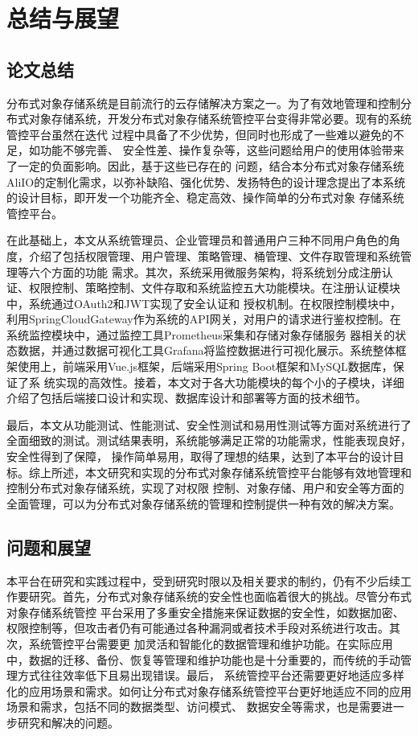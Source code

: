 \chapter{总结与展望}

\section{论文总结}


分布式对象存储系统是目前流行的云存储解决方案之一。为了有效地管理和控制分布式对象存储系统，开发分布式对象存储系统管控平台变得非常必要。现有的系统管控平台虽然在迭代
过程中具备了不少优势，但同时也形成了一些难以避免的不足，如功能不够完善、 安全性差、操作复杂等，这些问题给用户的使用体验带来了一定的负面影响。因此，基于这些已存在的
问题，结合本分布式对象存储系统AliIO的定制化需求，以弥补缺陷、强化优势、发扬特色的设计理念提出了本系统的设计目标，即开发一个功能齐全、稳定高效、操作简单的分布式对象
存储系统管控平台。

在此基础上，本文从系统管理员、企业管理员和普通用户三种不同用户角色的角度，介绍了包括权限管理、用户管理、策略管理、桶管理、文件存取管理和系统管理等六个方面的功能
需求。其次，系统采用微服务架构，将系统划分成注册认证、权限控制、策略控制、文件存取和系统监控五大功能模块。在注册认证模块中，系统通过OAuth2和JWT实现了安全认证和
授权机制。在权限控制模块中，利用SpringCloudGateway作为系统的API网关，对用户的请求进行鉴权控制。在系统监控模块中，通过监控工具Prometheus采集和存储对象存储服务
器相关的状态数据，并通过数据可视化工具Grafana将监控数据进行可视化展示。系统整体框架使用上，前端采用Vue.js框架，后端采用Spring Boot框架和MySQL数据库，保证了系
统实现的高效性。接着，本文对于各大功能模块的每个小的子模块，详细介绍了包括后端接口设计和实现、数据库设计和部署等方面的技术细节。

最后，本文从功能测试、性能测试、安全性测试和易用性测试等方面对系统进行了全面细致的测试。测试结果表明，系统能够满足正常的功能需求，性能表现良好，安全性得到了保障，
操作简单易用，取得了理想的结果，达到了本平台的设计目标。综上所述，本文研究和实现的分布式对象存储系统管控平台能够有效地管理和控制分布式对象存储系统，实现了对权限
控制、对象存储、用户和安全等方面的全面管理，可以为分布式对象存储系统的管理和控制提供一种有效的解决方案。




\section{问题和展望}

本平台在研究和实践过程中，受到研究时限以及相关要求的制约，仍有不少后续工作要研究。首先，分布式对象存储系统的安全性也面临着很大的挑战。尽管分布式对象存储系统管控
平台采用了多重安全措施来保证数据的安全性，如数据加密、权限控制等，但攻击者仍有可能通过各种漏洞或者技术手段对系统进行攻击。其次，系统管控平台需要更
加灵活和智能化的数据管理和维护功能。在实际应用中，数据的迁移、备份、恢复等管理和维护功能也是十分重要的，而传统的手动管理方式往往效率低下且易出现错误。最后，
系统管控平台还需要更好地适应多样化的应用场景和需求。如何让分布式对象存储系统管控平台更好地适应不同的应用场景和需求，包括不同的数据类型、访问模式、
数据安全等需求，也是需要进一步研究和解决的问题。

